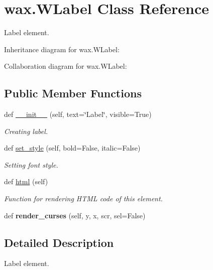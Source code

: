 \hypertarget{classwax_1_1WLabel}{}\section{wax.\+W\+Label Class Reference}
\label{classwax_1_1WLabel}


Label element.  




Inheritance diagram for wax.\+W\+Label\+:


Collaboration diagram for wax.\+W\+Label\+:
\subsection*{Public Member Functions}
\begin{DoxyCompactItemize}
\item 
def \hyperlink{classwax_1_1WLabel_a37b4cd48abfeb5ca448c9201e64c8dd4}{\+\_\+\+\_\+init\+\_\+\+\_\+} (self, text=\char`\"{}Label\char`\"{}, visible=True)
\begin{DoxyCompactList}\small\item\em Creating label. \end{DoxyCompactList}\item 
def \hyperlink{classwax_1_1WLabel_a27c6e0cf315dfa8b84064e8eb98e1d27}{set\+\_\+style} (self, bold=False, italic=False)
\begin{DoxyCompactList}\small\item\em Setting font style. \end{DoxyCompactList}\item 
def \hyperlink{classwax_1_1WLabel_afa5dcb902556d5245be1bab77b26b236}{html} (self)
\begin{DoxyCompactList}\small\item\em Function for rendering H\+T\+ML code of this element. \end{DoxyCompactList}\item 
def {\bfseries render\+\_\+curses} (self, y, x, scr, sel=False)\hypertarget{classwax_1_1WLabel_afe6c342d83837cc3a54961b307465c12}{}\label{classwax_1_1WLabel_afe6c342d83837cc3a54961b307465c12}

\end{DoxyCompactItemize}


\subsection{Detailed Description}
Label element. 

